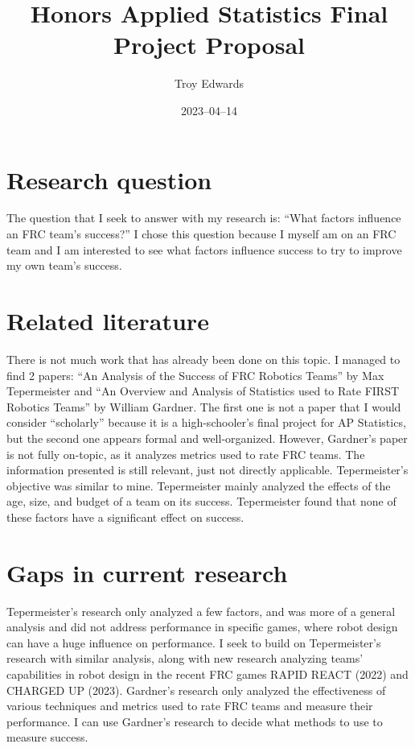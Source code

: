 \documentclass[12pt, letterpaper]{article}
\title{Honors Applied Statistics Final Project Proposal}
\author{Troy Edwards}
\date{2023--04--14}
\begin{document}
\maketitle

\section{Research question}

The question that I seek to answer with my research is: ``What factors influence an FRC team's success?'' I chose this
question because I myself am on an FRC team and I am interested to see what factors influence success to try to improve
my own team's success.

\section{Related literature}

There is not much work that has already been done on this topic. I managed to find 2 papers: ``An Analysis of the
Success of FRC Robotics Teams'' by Max Tepermeister and ``An Overview and Analysis of Statistics used to Rate FIRST
Robotics Teams'' by William Gardner. The first one is not a paper that I would consider ``scholarly'' because it is a
high-schooler's final project for AP Statistics, but the second one appears formal and well-organized. However,
Gardner's paper is not fully on-topic, as it analyzes metrics used to rate FRC teams. The information presented is
still relevant, just not directly applicable. Tepermeister's objective was similar to mine. Tepermeister mainly
analyzed the effects of the age, size, and budget of a team on its success. Tepermeister found that none of these
factors have a significant effect on success. 

\section{Gaps in current research}

Tepermeister's research only analyzed a few factors, and was more of a general analysis and did not address performance
in specific games, where robot design can have a huge influence on performance. I seek to build on Tepermeister's
research with similar analysis, along with new research analyzing teams' capabilities in robot design in the recent FRC
games RAPID REACT (2022) and CHARGED UP (2023). Gardner's research only analyzed the effectiveness of various
techniques and metrics used to rate FRC teams and measure their performance. I can use Gardner's research to decide
what methods to use to measure success. 
\end{document}
